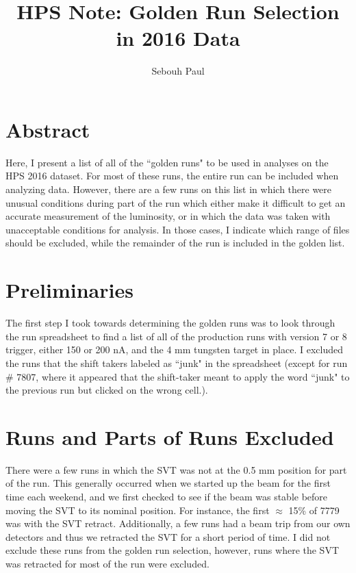 \documentclass[11pt]{article}
\title{HPS Note:  Golden Run Selection in 2016 Data}
\author{Sebouh Paul}
\date{}                                           %
\begin{document}
\maketitle

\section{Abstract}
Here, I present a list of all of the ``golden runs" to be used in analyses on the HPS 2016 dataset.  For most of these runs, the entire run can be included when analyzing data.   However, there are a few runs on this list in which there were unusual conditions during part of the run which either make it difficult to get an accurate measurement of the luminosity, or in which the data was taken with unacceptable conditions for analysis.  In those cases, I indicate which range of files should be excluded, while the remainder of the run is included in the golden list.  


\section{Preliminaries}
The first step I took towards determining the golden runs was to look through the run spreadsheet to find a list of all of the production runs with version 7 or 8 trigger, either 150 or 200 nA, and the 4 mm tungsten target in place.  I excluded the runs that the shift takers labeled as ``junk" in the spreadsheet (except for run \# 7807, where it appeared that the shift-taker meant to apply the word ``junk" to the previous run but clicked on the wrong cell.).  




\section{Runs and Parts of Runs Excluded}
\label{sec:exclude}
There were a few runs in which the SVT was not at the 0.5 mm position for part of the run.  This generally occurred when we started up the beam for the first time each weekend, and we first checked to see if the beam was stable before moving the SVT to its nominal position.  For instance, the first $\approx$ 15\% of 7779 was with the SVT retract.  Additionally, a few runs had a beam trip from our own detectors and thus we retracted the SVT for a short period of time.  I did not exclude these runs from the golden run selection, however, runs where the SVT was retracted for most of the run were excluded.  
 
\end{document}

